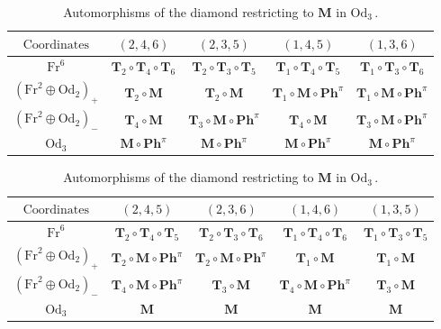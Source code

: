 \documentclass{pspum-l}
\theoremstyle{definition}
\theoremstyle{remark}
\numberwithin{equation}{section}
\begin{document}
{\renewcommand{\arraystretch}{1.2}
\begin{table}
\begin{tabular}{ |c|c|c|c|c| } 
\hline
 $\text{Coordinates}$  & $(2,4,6)$ & $(2,3,5)$ & $(1,4,5)$ & $(1,3,6)$ \\
 \hline
 \hline
 $\text{Fr}^6$ & $\textbf{T}_2\circ\textbf{T}_4\circ\textbf{T}_6$ & $\textbf{T}_2\circ\textbf{T}_3\circ\textbf{T}_5$ & $\textbf{T}_1\circ\textbf{T}_4\circ\textbf{T}_5$ & $\textbf{T}_1\circ\textbf{T}_3\circ\textbf{T}_6$ \\
 \hline
$\left( \text{Fr}^2\oplus \text{Od}_2 \right)_+$ & $\textbf{T}_2\circ\textbf{M}$ & $\textbf{T}_2\circ\textbf{M}$ & $\textbf{T}_1\circ\textbf{M}\circ \textbf{Ph}^\pi$ & $\textbf{T}_1\circ\textbf{M}\circ \textbf{Ph}^\pi$ \\ 
\hline
$\left( \text{Fr}^2\oplus \text{Od}_2 \right)_-$ & $\textbf{T}_4\circ\textbf{M}$ & $\textbf{T}_3\circ\textbf{M}\circ \textbf{Ph}^\pi$ & $\textbf{T}_4\circ\textbf{M}$ & $\textbf{T}_3\circ\textbf{M}\circ \textbf{Ph}^\pi$ \\ 
\hline
$\text{Od}_3$ & $\textbf{M}\circ \textbf{Ph}^\pi$ & $\textbf{M}\circ \textbf{Ph}^\pi$ & $\textbf{M}\circ \textbf{Ph}^\pi$ & $\textbf{M}\circ \textbf{Ph}^\pi$  \\
\hline
\end{tabular}
\caption{Automorphisms of the diamond restricting to $\textbf{M}\circ \textbf{Ph}^\pi$ in $\text{Od}_3\,$.}
\label{tab:automorphisms1}


\begin{tabular}{ |c|c|c|c|c| } 
\hline
 $\text{Coordinates}$  & $(2,4,5)$ & $(2,3,6)$ & $(1,4,6)$ & $(1,3,5)$ \\
 \hline
 \hline
 $\text{Fr}^6$ & $\textbf{T}_2\circ\textbf{T}_4\circ\textbf{T}_5$ & $\textbf{T}_2\circ\textbf{T}_3\circ\textbf{T}_6$ & $\textbf{T}_1\circ\textbf{T}_4\circ\textbf{T}_6$ & $\textbf{T}_1\circ\textbf{T}_3\circ\textbf{T}_5$ \\
 \hline
$\left( \text{Fr}^2\oplus \text{Od}_2 \right)_+$ & $\textbf{T}_2\circ\textbf{M}\circ \textbf{Ph}^\pi$ & $\textbf{T}_2\circ\textbf{M}\circ \textbf{Ph}^\pi$ & $\textbf{T}_1\circ\textbf{M}$ & $\textbf{T}_1\circ\textbf{M}$ \\ 
\hline
$\left( \text{Fr}^2\oplus \text{Od}_2 \right)_-$ & $\textbf{T}_4\circ\textbf{M}\circ \textbf{Ph}^\pi$ & $\textbf{T}_3\circ\textbf{M}$ & $\textbf{T}_4\circ\textbf{M}\circ \textbf{Ph}^\pi$ & $\textbf{T}_3\circ\textbf{M}$ \\ 
\hline
$\text{Od}_3$ & $\textbf{M}$ & $\textbf{M}$ & $\textbf{M}$ & $\textbf{M}$  \\
\hline
\end{tabular}
\caption{Automorphisms of the diamond restricting to $\textbf{M}$ in $\text{Od}_3\,$.}
\label{tab:automorphisms2}
\end{table}}
\end{document}
